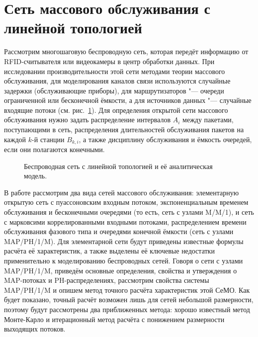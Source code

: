 \section{Сеть массового обслуживания с линейной топологией}\label{sec:ch4_queueing_network}
Рассмотрим многошаговую беспроводную сеть, которая передёт информацию от RFID-считывателя или видеокамеры в центр обработки данных. При исследовании производительности этой сети методами теории массового обслуживания, для моделирования каналов связи используются случайные задержки (обслуживающие приборы), для маршрутизаторов "--- очереди ограниченной или бесконечной ёмкости, а для источников данных "--- случайные входящие потоки (см. рис.~\ref{fig:ch4_network_model}). Для определения открытой сети массового обслуживания нужно задать распределение интервалов $A_i$ между пакетами, поступающими в сеть, распределения длительностей обслуживания пакетов на каждой $k$-й станции $B_{k,i}$, а также дисциплину обслуживания и ёмкость очередей, если они полагаются конечными.

\begin{figure}[h]
  \caption{Беспроводная сеть с линейной топологией и её аналитическая модель.}
  \label{fig:ch4_network_model}
\end{figure}


В работе рассмотрим два вида сетей массового обслуживания: элементарную открытую сеть с пуассоновским входным потоком, экспоненциальным временем обслуживания и бесконечными очередями (то есть, сеть с узлами M/M/1), и сеть с марковсими коррелированными входными потоками, распределением времени обслуживания фазового типа и очередями конечной ёмкости (сеть с узлами MAP/PH/1/M). Для элементарной сети будут приведены известные формулы расчёта её характеристик, а также выделены её ключевые недостатки применительно к моделированию беспроводных сетей. Говоря о сети с узлами MAP/PH/1/M, приведём основные определения, свойства и утверждения о MAP-потоках и PH-распределениях, рассмотрим свойства системы MAP/PH/1/M и опишем метод точного расчёта характеристик этой СеМО. Как будет показано, точный расчёт возможен лишь для сетей небольшой размерности, поэтому будут рассмотрены два приближенных метода: хорошо известный метод Монте-Карло и итерационный метод расчёта с понижением размерности выходящих потоков.



